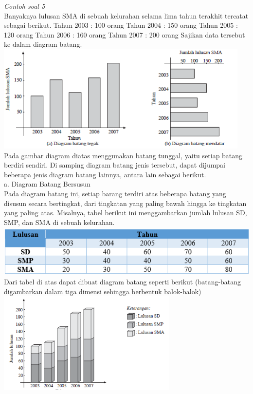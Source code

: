 \documentclass[11pt,fleqn]{book} %
\begin{document}
{\textit{Contoh soal 5}\\


Banyaknya lulusan SMA di sebuah kelurahan selama lima tahun terakhit tercatat sebagai berikut.
Tahun 2003	: 100 orang
Tahun 2004	: 150 orang
Tahun 2005	: 120 orang
Tahun 2006	: 160 orang
Tahun 2007	: 200 orang
Sajikan data tersebut ke dalam diagram batang.\\


\includegraphics[width = 12.7cm, height= 5.4cm]{Pictures/Gb16_diana.png}\\

Pada gambar diagram diatas menggunakan batang tunggal, yaitu setiap batang berdiri sendiri. Di samping diagram batang jenis tersebut, dapat dijumpai beberapa jenis diagram batang lainnya, antara lain sebagai berikut.\\

		a.	Diagram Batang Bersusun\\
		
	Pada diagram batang ini, setiap barang terdiri atas beberapa batang yang disusun secara bertingkat, dari tingkatan yang paling bawah hingga ke tingkatan yang paling atas. Misalnya, tabel berikut ini menggambarkan jumlah lulusan SD, SMP, dan SMA di sebuah kelurahan.\\
	
\includegraphics[width = 14cm, height= 2.6cm]{Pictures/Gb17_diana.png}\\

Dari tabel di atas dapat dibuat diagram batang seperti berikut (batang-batang digambarkan dalam tiga dimensi sehingga berbentuk balok-balok)\\

\includegraphics[width = 9cm, height= 5.1cm]{Pictures/Gb18_diana.png}\\

}
\end{document}
